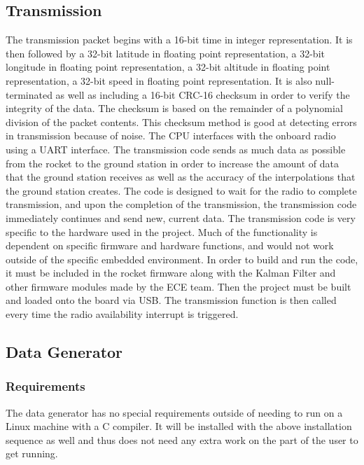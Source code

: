 \documentclass[onecolumn, draftclsnofoot,10pt, compsoc]{IEEEtran}
\begin{document}
\subsection{Transmission}
The transmission packet begins with a 16-bit time in integer representation.
It is then followed by a 32-bit latitude in floating point representation, a 32-bit longitude in floating point representation, a 32-bit altitude in floating point representation, a 32-bit speed in floating point representation.
It is also null-terminated as well as including a 16-bit CRC-16 checksum in order to verify the integrity of the data.
The checksum is based on the remainder of a polynomial division of the packet contents.
This checksum method is good at detecting errors in transmission because of noise.
The CPU interfaces with the onboard radio using a UART interface.
The transmission code sends as much data as possible from the rocket to the ground station in order to increase the amount of data that the ground station receives as well as the accuracy of the interpolations that the ground station creates.
The code is designed to wait for the radio to complete transmission, and upon the completion of the transmission, the transmission code immediately continues and send new, current data.
The transmission code is very specific to the hardware used in the project.
Much of the functionality is dependent on specific firmware and hardware functions, and would not work outside of the specific embedded environment.
In order to build and run the code, it must be included in the rocket firmware along with the Kalman Filter and other firmware modules made by the ECE team.
Then the project must be built and loaded onto the board via USB.
The transmission function is then called every time the radio availability interrupt is triggered.


\subsection{Data Generator}
\subsubsection{Requirements}
The data generator has no special requirements outside of needing to run on a Linux machine with a C compiler. It will be installed with the above installation sequence as well and thus does not need any extra work on the part of the user to get running.
\end{document}
